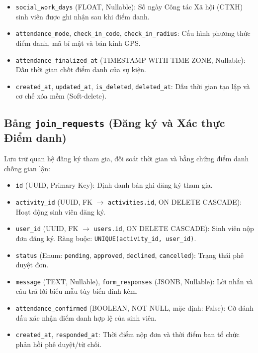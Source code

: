 \begin{itemize}[leftmargin=*, noitemsep, topsep=1pt]
    \item \texttt{social\_work\_days} (FLOAT, Nullable): Số ngày Công tác Xã hội (CTXH) sinh viên được ghi nhận sau khi điểm danh.
    \item \texttt{attendance\_mode}, \texttt{check\_in\_code}, \texttt{check\_in\_radius}: Cấu hình phương thức điểm danh, mã bí mật và bán kính GPS.
    \item \texttt{attendance\_finalized\_at} (TIMESTAMP WITH TIME ZONE, Nullable): Dấu thời gian chốt điểm danh của sự kiện.
    \item \texttt{created\_at}, \texttt{updated\_at}, \texttt{is\_deleted}, \texttt{deleted\_at}: Dấu thời gian tạo lập và cơ chế xóa mềm (Soft-delete).
\end{itemize}

\subsection{Bảng \texttt{join\_requests} (Đăng ký và Xác thực Điểm danh)}
Lưu trữ quan hệ đăng ký tham gia, đối soát thời gian và bằng chứng điểm danh chống gian lận:
\begin{itemize}[leftmargin=*, noitemsep, topsep=1pt]
    \item \texttt{id} (UUID, Primary Key): Định danh bản ghi đăng ký tham gia.
    \item \texttt{activity\_id} (UUID, FK $\rightarrow$ \texttt{activities.id}, ON DELETE CASCADE): Hoạt động sinh viên đăng ký.
    \item \texttt{user\_id} (UUID, FK $\rightarrow$ \texttt{users.id}, ON DELETE CASCADE): Sinh viên nộp đơn đăng ký. Ràng buộc: \texttt{UNIQUE(activity\_id, user\_id)}.
    \item \texttt{status} (Enum: \texttt{pending}, \texttt{approved}, \texttt{declined}, \texttt{cancelled}): Trạng thái phê duyệt đơn.
    \item \texttt{message} (TEXT, Nullable), \texttt{form\_responses} (JSONB, Nullable): Lời nhắn và câu trả lời biểu mẫu tùy biến đính kèm.
    \item \texttt{attendance\_confirmed} (BOOLEAN, NOT NULL, mặc định: False): Cờ đánh dấu xác nhận điểm danh hợp lệ của sinh viên.
    \item \texttt{created\_at}, \texttt{responded\_at}: Thời điểm nộp đơn và thời điểm ban tổ chức phản hồi phê duyệt/từ chối.
\end{itemize}

